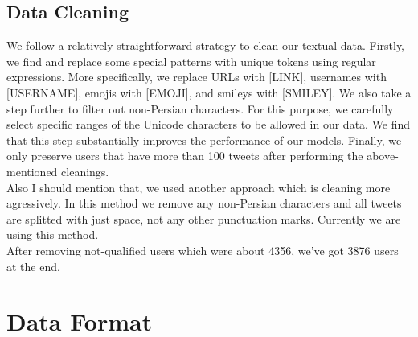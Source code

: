 \documentclass[10pt, a4paper]{article}
\begin{document}
\subsection{Data Cleaning}
We follow a relatively straightforward strategy to clean our textual data.
Firstly, we find and replace some special patterns with unique tokens using regular expressions.
More specifically, we replace URLs with [LINK], usernames with [USERNAME], emojis with [EMOJI], and smileys with [SMILEY].
We also take a step further to filter out non-Persian characters.
For this purpose, we carefully select specific ranges of the Unicode characters to be allowed in our data.
We find that this step substantially improves the performance of our models.
Finally, we only preserve users that have more than 100 tweets after performing the above-mentioned cleanings.
\\
Also I should mention that, we used another approach which is cleaning more agressively. In this method we remove any non-Persian
characters and all tweets are splitted with just space, not any other punctuation marks. Currently we are using this method.
\\
After removing not-qualified users which were about 4356, we've got 3876 users at the end.

\section{Data Format}
\end{document}
